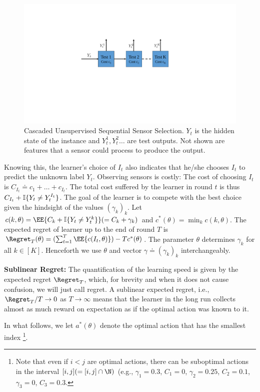 \begin{figure}[!h]
	\centering
	\includegraphics[scale=.4]{../Figures/Cascade.pdf}
	\caption{\footnotesize Cascaded Unsupervised Sequential Sensor Selection. $Y_t$ is the hidden state of the instance and $Y_t^1, Y_t^2 \ldots$ are test outputs. Not shown are features that a sensor could process to produce the output.}
	\label{fig:SensorCascade}
	\vspace{-.2cm}
\end{figure} 
Knowing this, the learner's choice of $I_t$ also indicates that he/she chooses $I_t$ to predict the unknown label $Y_t$.
Observing sensors is costly: The cost of choosing $I_t$ is $C_{I_t} \doteq c_1 + \dots + c_{I_t}$.
The total cost suffered by the learner in round $t$ is thus $C_{I_t} + \mathbb{I}\{Y_t \ne Y_t^{I_t}\}$.
The goal of the learner is to compete with the best choice given the hindsight of the values $(\gamma_k)_k$.
Let $c(k,\theta) = \EE{ C_{k} +\ind{Y_t \ne Y_t^{k} }}  (= C_k + \gamma_k)$ and $c^*(\theta) = \min_k c(k,\theta)$. The expected regret of learner up to the end of round $T$ is 
$\Regret_T(\theta) =( \sum_{t=1}^T \EE{ c(I_t,\theta) }) - T c^*(\theta)$. The parameter $\theta$ determines $\gamma_k$ for all $k\in [K]$. Henceforth we use $\theta$ and vector $\gamma\doteq (\gamma_k)_k$ interchangeably.

\noindent
{\bf Sublinear Regret:} The quantification of the learning speed is given by the expected regret 
$\Regret_T$, which, for brevity and when it does not cause confusion, 
we will just call regret. A sublinear expected regret, i.e., $\Regret_T/T \to 0$ as $T\to \infty$ means that the learner in the long run collects almost as much reward on expectation as if the optimal action was known to it.


In what follows, we let $a^*(\theta)$ denote the optimal action that has the smallest index
\footnote{Note that even if $i<j$ are optimal actions, there can be suboptimal actions in the interval $[i,j] (=[i,j]\cap \N)$
(e.g., $\gamma_1=0.3$, $C_1=0$, $\gamma_2=0.25$, $C_2=0.1$, $\gamma_3=0$, $C_3=0.3$.}.
%


